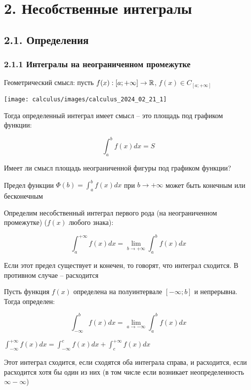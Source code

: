 \documentclass[12pt]{article}
\begin{document}
    \clearpage

    \section{2. Несобственные интегралы}

    \subsection{2.1. Определения}

    \subsubsection{2.1.1 Интегралы на неограниченном промежутке}

    Геометрический смысл: пусть $f(x) : [a; +\infty] \to \mathbb{R}$, $f(x) \in C_{[a; +\infty]}$

    \begin{center}
        \texttt{[image: calculus/images/calculus\_2024\_02\_21\_1]}
    \end{center}

    Тогда определенный интеграл имеет смысл -- это площадь под графиком функции:

    \[\int^{b}_{a} f(x) dx = S\]

    Имеет ли смысл площадь неограниченной фигуры под графиком функции?

    Предел функции $\Phi (b) = \int^{b}_{a} f(x) dx$ при $b \to +\infty$ может быть конечным или бесконечным

     \hypertarget{improperintegralfirstkind}{Определим несобственный интеграл первого рода} (на неограниченном промежутке) ($f(x)$ любого знака):

    \[\int^{+\infty}_{a} f(x) dx = \lim_{b \to +\infty} \int^{b}_{a} f(x) dx\]

    \Nota Если этот предел существует и конечен, то говорят, что интеграл сходится. В противном случае -- расходится

     Пусть функция $f(x)$ определена на полуинтервале $[-\infty; b]$ и непрерывна. Тогда определен:

    \[\int^{b}_{-\infty} f(x) dx = \lim_{a \to -\infty} \int^{b}_{a} f(x) dx\]

     $\displaystyle \int^{+\infty}_{-\infty} f(x) dx = \int^{c}_{-\infty} f(x) dx + \int^{+\infty}_{c} f(x) dx$

    \Nota Этот интеграл сходится, если сходятся оба интеграла справа, и расходится, если расходится хотя бы один из них
    (в том числе если возникает неопределенность $\infty - \infty$)
\end{document}
